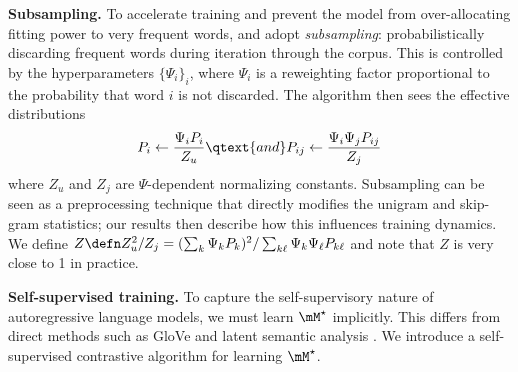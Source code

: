 \textbf{Subsampling.} To accelerate training and prevent the model from over-allocating fitting power to very frequent words, \cite{mikolov2013distributed} and \cite{pennington2014glove} adopt \textit{subsampling}: probabilistically discarding frequent words during iteration through the corpus. This is controlled by the hyperparameters $\{\Psi_i\}_i$, where $\Psi_i$ is a reweighting factor proportional to the probability that word $i$ is not discarded. The algorithm then sees the effective distributions
\begin{equation*}
    P_i\gets \frac{\Psi_iP_i}{Z_u} \qtext{and} P_{ij}\gets \frac{\Psi_i\Psi_j P_{ij}}{Z_j}
\end{equation*}
where $Z_u$ and $Z_j$ are $\Psi$-dependent normalizing constants. Subsampling can be seen as a preprocessing technique that directly modifies the unigram and skip-gram statistics; our results then describe how this influences training dynamics.  We define $Z\defn Z_u^2/Z_j=(\sum_k\Psi_kP_k)^2/\sum_{k\ell} \Psi_k \Psi_\ell P_{k\ell}$ and note that $Z$ is very close to 1 in practice.

\textbf{Self-supervised training.} To capture the self-supervisory nature of autoregressive language models, we must learn $\Mstar$ implicitly. This differs from direct methods such as GloVe \citep{pennington2014glove} and latent semantic analysis \citep{landauer1997solution}. We introduce a self-supervised contrastive algorithm for learning $\Mstar$.
